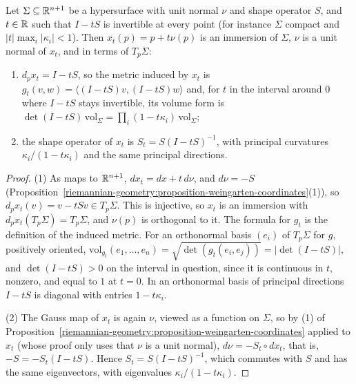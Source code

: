 \begin{proposition}\label{riemannian-geometry:proposition-parallel-hypersurfaces}
Let $\Sigma \subseteq \mathbb{R}^{n+1}$ be a hypersurface with unit normal $\nu$ and shape operator $S$, and $t \in \mathbb{R}$ such that $I - tS$ is invertible at every point (for instance $\Sigma$ compact and $|t|\max_i|\kappa_i| < 1$).
Then $x_t(p) = p + t\nu(p)$ is an immersion of $\Sigma$, $\nu$ is a unit normal of $x_t$, and in terms of $T_p\Sigma$:
\begin{enumerate}
\item $d_px_t = I - tS$, so the metric induced by $x_t$ is $g_t(v, w) = \langle(I - tS)v, (I - tS)w\rangle$ and, for $t$ in the interval around $0$ where $I - tS$ stays invertible, its volume form is
$\det(I - tS)\,\mathrm{vol}_\Sigma = \prod_i(1 - t\kappa_i)\,\mathrm{vol}_\Sigma$;
\item the shape operator of $x_t$ is $S_t = S(I - tS)^{-1}$, with principal curvatures $\kappa_i/(1 - t\kappa_i)$ and the same principal directions.
\end{enumerate}
\end{proposition}

\begin{proof}
(1) As maps to $\mathbb{R}^{n+1}$, $dx_t = dx + t\,d\nu$, and $d\nu = -S$ (Proposition~\ref{riemannian-geometry:proposition-weingarten-coordinates}(1)), so $d_px_t(v) = v - tSv \in T_p\Sigma$. This is injective, so $x_t$ is an
immersion with $d_px_t(T_p\Sigma) = T_p\Sigma$, and $\nu(p)$ is orthogonal to it. The formula for $g_t$ is the definition of the induced metric. For an orthonormal basis $(e_i)$ of $T_p\Sigma$ for $g$, positively oriented,
$\mathrm{vol}_{g_t}(e_1, \ldots, e_n) = \sqrt{\det(g_t(e_i, e_j))} = |\det(I - tS)|$, and $\det(I - tS) > 0$ on the interval in question, since it is continuous in $t$, nonzero, and equal to $1$ at $t = 0$.
In an orthonormal basis of principal directions $I - tS$ is diagonal with entries $1 - t\kappa_i$.

(2) The Gauss map of $x_t$ is again $\nu$, viewed as a function on $\Sigma$, so by (1) of Proposition~\ref{riemannian-geometry:proposition-weingarten-coordinates} applied to $x_t$ (whose proof only uses that $\nu$ is a unit
normal), $d\nu = -S_t \circ dx_t$, that is, $-S = -S_t(I - tS)$. Hence $S_t = S(I - tS)^{-1}$, which commutes with $S$ and has the same eigenvectors, with eigenvalues $\kappa_i/(1 - t\kappa_i)$.
\end{proof}

